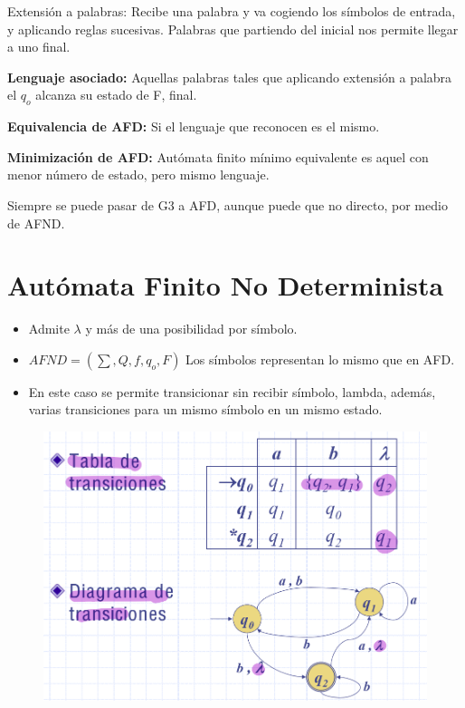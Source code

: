 \documentclass[12pt]{report} %
\begin{document}
Extensión a palabras: Recibe una palabra y va cogiendo los símbolos de
entrada, y aplicando reglas sucesivas. Palabras que partiendo del
inicial nos permite llegar a uno final.

\textbf{Lenguaje asociado:} Aquellas palabras tales que aplicando
extensión a palabra el \(q_o\) alcanza su estado de F, final.

\textbf{Equivalencia de AFD:} Si el lenguaje que reconocen es el mismo.

\textbf{Minimización de AFD:} Autómata finito mínimo equivalente es
aquel con menor número de estado, pero mismo lenguaje.

Siempre se puede pasar de G3 a AFD, aunque puede que no directo, por
medio de AFND.


\section{Autómata Finito No Determinista}

\begin{itemize}
\item
  Admite \(\lambda\) y más de una posibilidad por símbolo.
\item
  \(AFND=( \sum, Q, f, q_o, F)\) Los símbolos representan lo mismo que
  en AFD.
\item
  En este caso se permite transicionar sin recibir símbolo, lambda,
  además, varias transiciones para un mismo símbolo en un mismo estado.
\end{itemize}

\begin{figure}[H]
	{\includegraphics[scale=.4]{Untitled 4.png}}
\end{figure}
\end{document}
